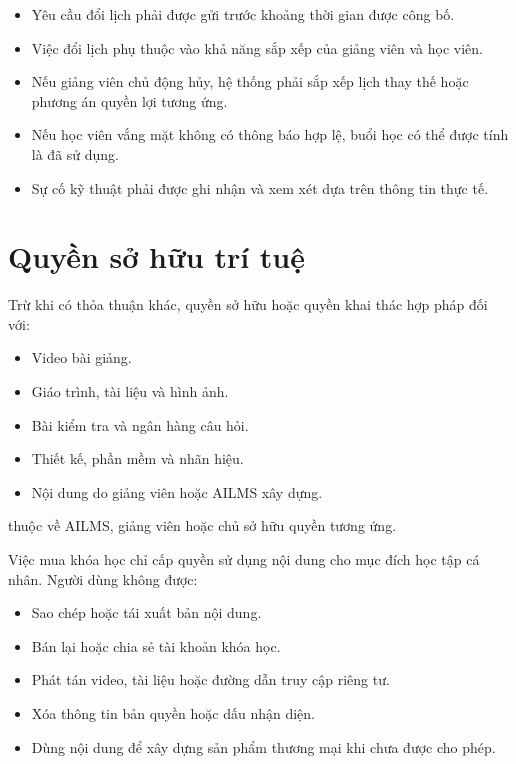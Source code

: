 \documentclass[12pt,a4paper]{article}
\begin{document}
\begin{itemize}
    \item Yêu cầu đổi lịch phải được gửi trước khoảng thời gian được công bố.
    \item Việc đổi lịch phụ thuộc vào khả năng sắp xếp của giảng viên và học viên.
    \item Nếu giảng viên chủ động hủy, hệ thống phải sắp xếp lịch thay thế
    hoặc phương án quyền lợi tương ứng.
    \item Nếu học viên vắng mặt không có thông báo hợp lệ,
    buổi học có thể được tính là đã sử dụng.
    \item Sự cố kỹ thuật phải được ghi nhận và xem xét dựa trên thông tin thực tế.
\end{itemize}

\section{Quyền sở hữu trí tuệ}

Trừ khi có thỏa thuận khác, quyền sở hữu hoặc quyền khai thác hợp pháp đối với:

\begin{itemize}
    \item Video bài giảng.
    \item Giáo trình, tài liệu và hình ảnh.
    \item Bài kiểm tra và ngân hàng câu hỏi.
    \item Thiết kế, phần mềm và nhãn hiệu.
    \item Nội dung do giảng viên hoặc AILMS xây dựng.
\end{itemize}

thuộc về AILMS, giảng viên hoặc chủ sở hữu quyền tương ứng.

Việc mua khóa học chỉ cấp quyền sử dụng nội dung cho mục đích học tập cá nhân.
Người dùng không được:

\begin{itemize}
    \item Sao chép hoặc tái xuất bản nội dung.
    \item Bán lại hoặc chia sẻ tài khoản khóa học.
    \item Phát tán video, tài liệu hoặc đường dẫn truy cập riêng tư.
    \item Xóa thông tin bản quyền hoặc dấu nhận diện.
    \item Dùng nội dung để xây dựng sản phẩm thương mại khi chưa được cho phép.
\end{itemize}
\end{document}
